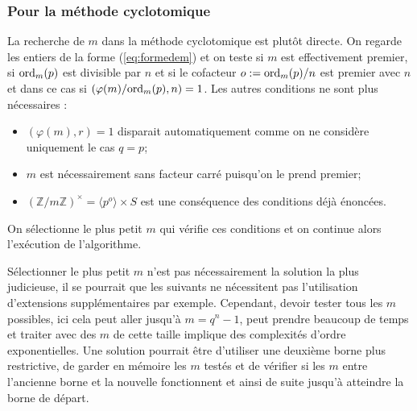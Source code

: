 \documentclass[a4paper]{article} %
\numberwithin{section}{part}
\numberwithin{equation}{section}
\newcommand\zmodninv[1]{(\mathbb{Z}/#1\mathbb{Z})^{\times}}
\newcommand\groupgen[1]{\langle{#1}\rangle}
\newcommand\ord[2]{\textup{ord}_{#1}(#2)}
\begin{document}
\subsubsection*{Pour la méthode cyclotomique}
\label{sec:recherchemcycl}

La recherche de $m$ dans la méthode cyclotomique est plutôt directe. On regarde
les entiers de la forme (\ref{eq:formedem}) et on teste si $m$ est effectivement
premier, si $\ord{m}{p}$ est divisible par $n$ et si le cofacteur
$o := \ord{m}{p}/n$ est premier avec $n$ et dans ce cas si 
$(\varphi(m)/\ord{m}{p}, n) = 1$. Les autres conditions ne sont plus 
nécessaires :
\vspace{0.3cm}
\begin{itemize}
    \item $(\varphi(m), r) = 1$ disparait automatiquement comme on
    ne considère uniquement le cas $q = p$;
    
    \item $m$ est nécessairement sans facteur carré puisqu'on le prend premier;

    \item $\zmodninv{m} = \groupgen{p^o}\times S$ est une conséquence des
    conditions déjà énoncées.
\end{itemize}
\vspace{0.3cm}

On sélectionne le plus petit $m$ qui vérifie ces conditions et on continue alors
l'exécution de l'algorithme.

\begin{rem}
Sélectionner le plus petit $m$ n'est pas nécessairement la solution la plus
judicieuse, il se pourrait que les suivants ne nécessitent pas l'utilisation
d'extensions supplémentaires par exemple. Cependant, devoir tester tous les $m$
possibles, ici cela peut aller jusqu'à $m = q^n - 1$, peut prendre beaucoup de
temps et traiter avec des $m$ de cette taille implique des complexités d'ordre
exponentielles. Une solution pourrait être d'utiliser une deuxième borne plus
restrictive, de garder en mémoire les $m$ testés et de vérifier si les $m$ entre
l'ancienne borne et la nouvelle fonctionnent et ainsi de suite jusqu'à atteindre
la borne de départ.
\end{rem}
\end{document}
